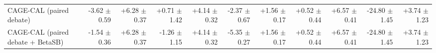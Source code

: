 \begin{tabular}{lrrrrrrrrrr}
CAGE-CAL (paired debate) & -3.62 {\scriptsize $\pm$ 0.59} & +6.28 {\scriptsize $\pm$ 0.37} & +0.71 {\scriptsize $\pm$ 1.42} & +4.14 {\scriptsize $\pm$ 0.32} & -2.37 {\scriptsize $\pm$ 0.67} & +1.56 {\scriptsize $\pm$ 0.17} & +0.52 {\scriptsize $\pm$ 0.44} & +6.57 {\scriptsize $\pm$ 0.41} & -24.80 {\scriptsize $\pm$ 1.45} & +3.74 {\scriptsize $\pm$ 1.23} \\
CAGE-CAL (paired debate + BetaSB) & -1.54 {\scriptsize $\pm$ 0.36} & +6.28 {\scriptsize $\pm$ 0.37} & -1.26 {\scriptsize $\pm$ 1.15} & +4.14 {\scriptsize $\pm$ 0.32} & -5.35 {\scriptsize $\pm$ 0.27} & +1.56 {\scriptsize $\pm$ 0.17} & +0.52 {\scriptsize $\pm$ 0.44} & +6.57 {\scriptsize $\pm$ 0.41} & -24.80 {\scriptsize $\pm$ 1.45} & +3.74 {\scriptsize $\pm$ 1.23} \\
\bottomrule
\end{tabular}
